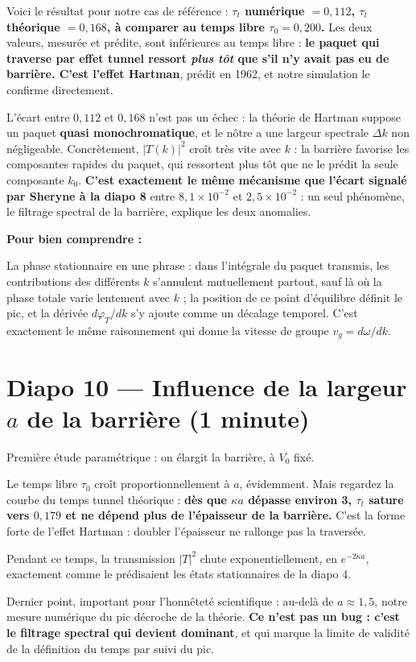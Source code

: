 \documentclass[11pt,a4paper]{article}
\newcommand{\diapo}[2]{\section*{Diapo #1 --- #2}}
\newenvironment{comprendre}%
  {\par\medskip\noindent\hrulefill\par\nopagebreak\textbf{Pour bien comprendre :}\itshape\par}%
  {\par\nopagebreak\noindent\hrulefill\par\medskip}
\begin{document}
Voici le résultat pour notre cas de référence :
\textbf{$\tau_t$ numérique $= 0{,}112$, $\tau_t$ théorique $= 0{,}168$, à
comparer au temps libre $\tau_0 = 0{,}200$.} Les deux valeurs, mesurée et
prédite, sont inférieures au temps libre :
\textbf{le paquet qui traverse par effet tunnel ressort \emph{plus tôt} que s'il
n'y avait pas eu de barrière. C'est l'effet Hartman}, prédit en 1962, et notre
simulation le confirme directement.

L'écart entre $0{,}112$ et $0{,}168$ n'est pas un échec : la théorie de Hartman
suppose un paquet \textbf{quasi monochromatique}, et le nôtre a une largeur
spectrale $\Delta k$ non négligeable. Concrètement, $|T(k)|^2$ croît très vite
avec $k$ : la barrière favorise les composantes rapides du paquet, qui
ressortent plus tôt que ne le prédit la seule composante $k_0$.
\textbf{C'est exactement le même mécanisme que l'écart signalé par Sheryne à
la diapo 8} entre $8{,}1\times10^{-2}$ et $2{,}5\times10^{-2}$ : un seul
phénomène, le filtrage spectral de la barrière, explique les deux anomalies.

\begin{comprendre}
La phase stationnaire en une phrase : dans l'intégrale du paquet transmis, les
contributions des différents $k$ s'annulent mutuellement partout, sauf là où la
phase totale varie lentement avec $k$ ; la position de ce point d'équilibre
définit le pic, et la dérivée $d\varphi_T/dk$ s'y ajoute comme un décalage
temporel. C'est exactement le même raisonnement qui donne la vitesse de groupe
$v_g = d\omega/dk$.
\end{comprendre}

\diapo{10}{Influence de la largeur $a$ de la barrière (1 minute)}

Première étude paramétrique : on élargit la barrière, à $V_0$ fixé.

Le temps libre $\tau_0$ croît proportionnellement à $a$, évidemment. Mais regardez
la courbe du temps tunnel théorique : \textbf{dès que $\kappa a$ dépasse environ
3, $\tau_t$ sature vers $0{,}179$ et ne dépend plus de l'épaisseur de la
barrière.} C'est la forme forte de l'effet Hartman : doubler l'épaisseur ne
rallonge pas la traversée.

Pendant ce temps, la transmission $|T|^2$ chute exponentiellement, en
$e^{-2\kappa a}$, exactement comme le prédisaient les états stationnaires de la
diapo 4.

Dernier point, important pour l'honnêteté scientifique : au-delà de
$a \approx 1{,}5$, notre mesure numérique du pic décroche de la théorie.
\textbf{Ce n'est pas un bug : c'est le filtrage spectral qui devient dominant},
et qui marque la limite de validité de la définition du temps par suivi du pic.
\end{document}

